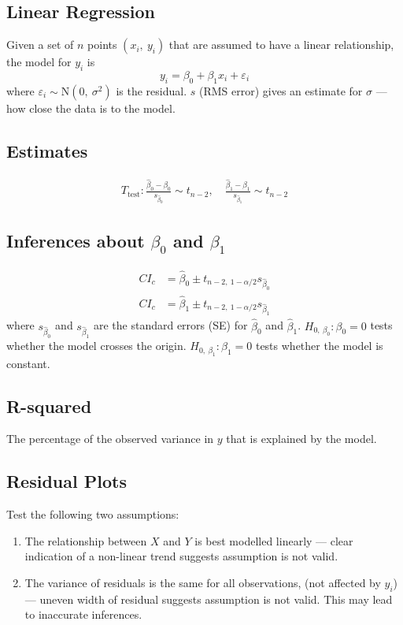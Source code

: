 \documentclass{article}
\begin{document}
\begin{multicols}{3}
    \section*{Linear Regression}
    Given a set of \(n\) points \(\left( x_i,\: y_i \right)\) that are assumed to have a linear relationship,
    the model for \(y_i\) is
    \begin{equation*}
        y_i = \beta_0 + \beta_1 x_i + \varepsilon_i
    \end{equation*}
    where \(\varepsilon_i \sim \mathrm{N}\left( 0,\: \sigma^2 \right)\) is the residual.
    \(s\) (RMS error) gives an estimate for \(\sigma\) --- how close the data is to the model.
    \subsection*{Estimates}
    \begin{align*}
        T_{\text{test}}:\frac{\hat{\beta}_0 - \beta_0}{s_{\hat{\beta}_0}} \sim t_{n-2},\quad \frac{\hat{\beta}_1 - \beta_1}{s_{\hat{\beta}_1}} \sim t_{n-2}
    \end{align*}
    \subsection*{Inferences about \(\beta_0\) and \(\beta_1\)}
    \begin{align*}
        CI_c & = \hat{\beta}_0 \pm t_{n-2,\: 1-\alpha/2} s_{\hat{\beta}_0} \\
        CI_c & = \hat{\beta}_1 \pm t_{n-2,\: 1-\alpha/2} s_{\hat{\beta}_1}
    \end{align*}
    where \(s_{\hat{\beta}_0}\) and \(s_{\hat{\beta}_1}\) are the standard errors (SE) for \(\hat{\beta}_0\) and \(\hat{\beta}_1\).
    \(H_{0,\:\beta_0}:\beta_0=0\) tests whether the model crosses the origin.
    \(H_{0,\:\beta_1}:\beta_1=0\) tests whether the model is constant.
    \subsection*{R-squared}
    The percentage of the observed variance in \(y\) that is explained by the model.
    \subsection*{Residual Plots}
    Test the following two assumptions:
    \begin{enumerate}
        \item The relationship between \(X\) and \(Y\) is best modelled linearly
              --- clear indication of a non-linear trend suggests assumption is not valid.
        \item The variance of residuals is the same for all observations, (not affected by \(y_i\))
              --- uneven width of residual suggests assumption is not valid.
              This may lead to inaccurate inferences.
    \end{enumerate}
\end{multicols}
\end{document}
